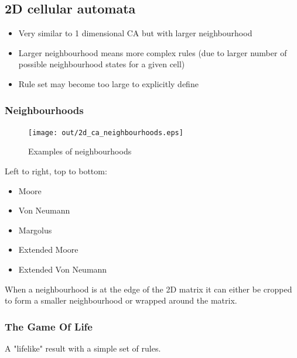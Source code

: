 \documentclass[a4paper]{article}
\begin{document}
\subsection{2D cellular automata}

\begin{itemize}
  \item Very similar to 1 dimensional CA but with larger neighbourhood
  \item Larger neighbourhood means more complex rules (due to larger number of
        possible neighbourhood states for a given cell)
  \item Rule set may become too large to explicitly define
\end{itemize}

\subsubsection{Neighbourhoods}

\begin{figure}[h!]
  \centering
  \texttt{[image: out/2d\_ca\_neighbourhoods.eps]}
  \caption{Examples of neighbourhoods}
  \label{fig:2d_ca_neighbourhoods}
\end{figure}
\FloatBarrier

Left to right, top to bottom:

\begin{itemize}
  \item Moore
  \item Von Neumann
  \item Margolus
  \item Extended Moore
  \item Extended Von Neumann
\end{itemize}

When a neighbourhood is at the edge of the 2D matrix it can either be cropped to
form a smaller neighbourhood or wrapped around the matrix.

\subsubsection{The Game Of Life}


A "lifelike" result with a simple set of rules.
\end{document}
